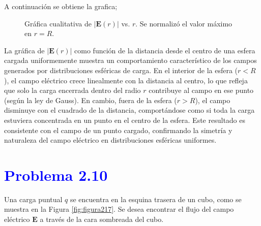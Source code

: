 \documentclass[12pt]{article}
\newcommand{\question}[1]{\textcolor{blue}{\textbf{#1}}}
\begin{document}
A continuación se obtiene la grafica;
\begin{figure}[H]
    \centering
    \caption{Gráfica cualitativa de \( |\mathbf{E}(r)| \) vs. \( r \). Se normalizó el valor máximo en \( r = R \).}
\end{figure}
La gráfica de \( |\mathbf{E}(r)| \) como función de la distancia desde el centro de una esfera cargada uniformemente muestra un comportamiento característico de los campos generados por distribuciones esféricas de carga. En el interior de la esfera (\( r < R \)), el campo eléctrico crece linealmente con la distancia al centro, lo que refleja que solo la carga encerrada dentro del radio \( r \) contribuye al campo en ese punto (según la ley de Gauss). En cambio, fuera de la esfera (\( r > R \)), el campo disminuye con el cuadrado de la distancia, comportándose como si toda la carga estuviera concentrada en un punto en el centro de la esfera. Este resultado es consistente con el campo de un punto cargado, confirmando la simetría y naturaleza del campo eléctrico en distribuciones esféricas uniformes.

\section*{\question{Problema 2.10}}

Una carga puntual \( q \) se encuentra en la esquina trasera de un cubo, como se muestra en la Figura \ref{fig:figura217}. Se desea encontrar el flujo del campo eléctrico \( \mathbf{E} \) a través de la cara sombreada del cubo.
\end{document}
